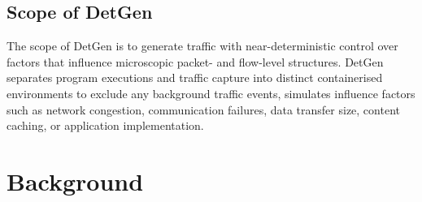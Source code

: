 \subsection{Scope of DetGen}

The scope of DetGen is to generate traffic with near-deterministic control over factors that influence microscopic packet- and flow-level structures. DetGen separates program executions and traffic capture into distinct containerised environments to exclude any background traffic events, simulates influence factors such as network congestion, communication failures, data transfer size, content caching, or application implementation. %


\section{Background}\label{Sec:background}

%
%
%

